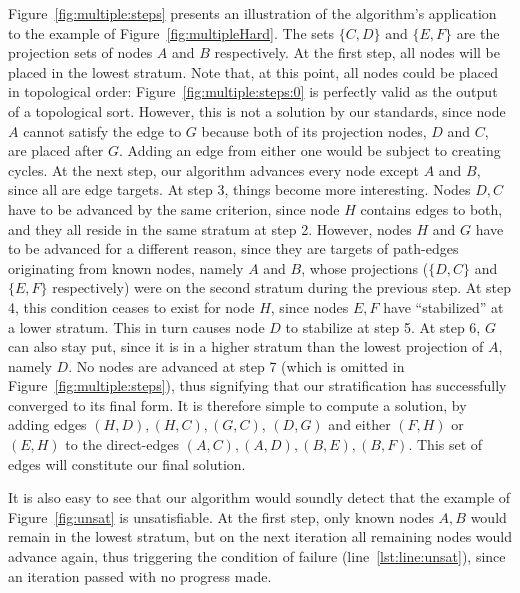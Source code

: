 Figure~\ref{fig:multiple:steps} presents an illustration of the
algorithm's application to the example of
Figure~\ref{fig:multipleHard}. The sets $\{C,D\}$ and $\{E,F\}$ are
the projection sets of nodes $A$ and $B$ respectively. At the first
step, all nodes will be placed in the lowest stratum. Note that, at
this point, all nodes could be placed in topological order:
Figure~\ref{fig:multiple:steps:0} is perfectly valid as the output
of a topological sort. However, this is not a
solution by our standards, since node $A$ cannot satisfy the edge to
$G$ because both of its projection nodes, $D$ and $C$, are placed
after $G$. Adding an edge from either one would be subject to creating
cycles. At the next step, our algorithm advances every node except $A$
and $B$, since all are edge targets. At step 3, things become more
interesting. Nodes $D,C$ have to be advanced by the same criterion,
since node $H$ contains edges to both, and they all reside in the same
stratum at step 2. However, nodes $H$ and $G$ have to be advanced for
a different reason, since they are targets of path-edges originating
from known nodes, namely $A$ and $B$, whose projections ($\{D,C\}$ and
$\{E,F\}$ respectively) were on the second stratum during the previous
step. At step 4, this condition ceases to exist for node $H$, since
nodes $E,F$ have ``stabilized'' at a lower stratum. This in turn
causes node $D$ to stabilize at step 5. At step 6, $G$ can also stay
put, since it is in a higher stratum than the lowest projection of
$A$, namely $D$. No nodes are advanced at step 7 (which is omitted in
Figure~\ref{fig:multiple:steps}), thus signifying that our
stratification has successfully converged to its final form. It is
therefore simple to compute a solution, by adding edges $(H,D),
(H,C), (G,C)$, $(D,G)$ and either $(F,H)$ or $(E,H)$
to the direct-edges $(A,C), (A,D), (B,E), (B,F)$. This set of edges
will constitute our final solution.

It is also easy to see that our algorithm would soundly detect that
the example of Figure~\ref{fig:unsat} is unsatisfiable. At the first
step, only known nodes $A,B$ would remain in the lowest stratum, but
on the next iteration all remaining nodes would advance again, thus
triggering the condition of failure (line~\ref{lst:line:unsat}), since
an iteration passed with no progress made.


